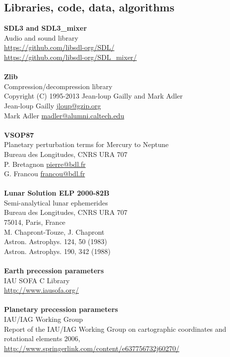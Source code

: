 \documentclass[Orbiter User Manual.tex]{subfiles}
\begin{document}
\subsection{Libraries, code, data, algorithms}
\textbf{SDL3 and SDL3_mixer}\\
Audio and sound library\\
\url{https://github.com/libsdl-org/SDL/}\\
\url{https://github.com/libsdl-org/SDL_mixer/}\\
\\
\textbf{Zlib}\\
Compression/decompression library\\
Copyright (C) 1995-2013 Jean-loup Gailly and Mark Adler\\
Jean-loup Gailly \href{mailto:jloup@gzip.org}{jloup@gzip.org}\\
Mark Adler \href{mailto:madler@alumni.caltech.edu}{madler@alumni.caltech.edu}\\
\\
\textbf{VSOP87}\\
Planetary perturbation terms for Mercury to Neptune\\
Bureau des Longitudes, CNRS URA 707\\
P. Bretagnon \href{mailto:pierre@bdl.fr}{pierre@bdl.fr}\\
G. Francou \href{mailto:francou@bdl.fr}{francou@bdl.fr}\\
\\
\textbf{Lunar Solution ELP 2000-82B}\\
Semi-analytical lunar ephemerides\\
Bureau des Longitudes, CNRS URA 707\\
75014, Paris, France\\
M. Chapront-Touze, J. Chapront\\
Astron. Astrophys. 124, 50 (1983)\\
Astron. Astrophys. 190, 342 (1988)\\
\\
\textbf{Earth precession parameters}\\
IAU SOFA C Library\\
\url{http://www.iausofa.org/}\\
\\
\textbf{Planetary precession parameters}\\
IAU/IAG Working Group\\
Report of the IAU/IAG Working Group on cartographic coordinates and rotational elements 2006, \url{http://www.springerlink.com/content/e637756732j60270/}\\
\end{document}

